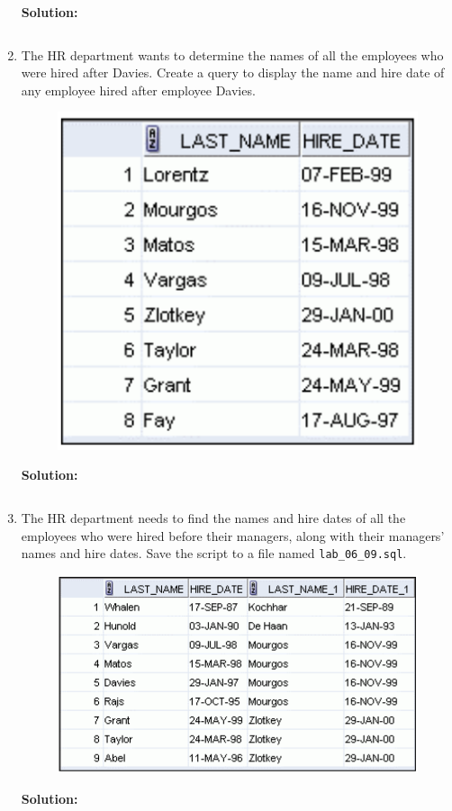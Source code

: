\documentclass[a4paper,12pt]{article}
\begin{document}
\begin{enumerate}
    \textbf{Solution: }
    \begin{lstlisting}[language=SQL]

    \end{lstlisting}
    \newpage
    \item The HR department wants to determine the names of all the employees who were hired after
Davies. Create a query to display the name and hire date of any employee hired after employee
Davies.
    \begin{figure}[h]
        \centering
            \centering
            \includegraphics[width=.3\linewidth]{graphics/68.png}
    \end{figure}
    
    \textbf{Solution: }
    \begin{lstlisting}[language=SQL]


    \end{lstlisting}
    \item The HR department needs to find the names and hire dates of all the employees who were hired
before their managers, along with their managers' names and hire dates. Save the script to a file
named \texttt{lab\_06\_09.sql}.
    \begin{figure}[h]
        \centering
            \centering
            \includegraphics[width=.3\linewidth]{graphics/69.png}
    \end{figure}
    
    \textbf{Solution: }
    \begin{lstlisting}[language=SQL]


    \end{lstlisting}
\end{enumerate}
\end{document}
